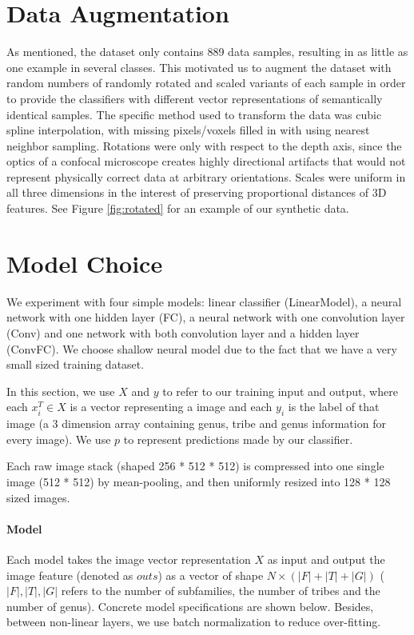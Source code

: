 \documentclass{article}
\begin{document}
\section{Data Augmentation}

As mentioned, the dataset only contains 889 data samples, resulting in as little as one example in several classes. This motivated us to augment the dataset with random numbers of randomly rotated and scaled variants of each sample in order to provide the classifiers with different vector representations of semantically identical samples. The specific method used to transform the data was cubic spline interpolation, with missing pixels/voxels filled in with using nearest neighbor sampling. Rotations were only with respect to the depth axis, since the optics of a confocal microscope creates highly directional artifacts that would not represent physically correct data at arbitrary orientations. Scales were uniform in all three dimensions in the interest of preserving proportional distances of 3D features. See Figure \ref{fig:rotated} for an example of our synthetic data.


\section{Model Choice}

We experiment with four simple models: linear classifier (LinearModel), a neural network with one hidden layer (FC), a neural network with one convolution layer (Conv) and one network with both convolution layer and a hidden layer (ConvFC). We choose shallow neural model due to the fact that we have a very small sized training dataset.

In this section, we use ${X}$ and ${y}$ to refer to our training input and output, where each ${x}_i^T\in {X}$ is a vector representing a image and each ${y_i}$ is the label of that image (a 3 dimension array containing genus, tribe and genus information for every image). We use ${p}$ to represent predictions made by our classifier. 

Each raw image stack (shaped 256 * 512 * 512) is compressed into one single image (512 * 512) by mean-pooling, and then uniformly resized into 128 * 128 sized images.

\paragraph{Model}

Each model takes the image vector representation $X$ as input and output the image feature (denoted as $\mathit{outs}$) as a vector of shape $N\times (|F| + |T| + |G|)$ ($|F|, |T|, |G|$ refers to the number of subfamilies, the number of tribes and the number of genus). Concrete model specifications are shown below. Besides, between non-linear layers, we use batch normalization to reduce over-fitting.
\end{document}
